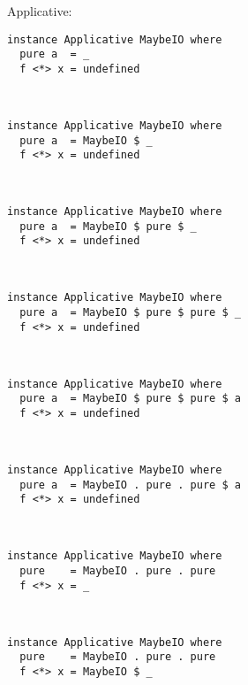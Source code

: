 \documentclass{beamer}
\begin{document}
\begin{frame}[fragile]
Applicative:
\begin{overprint}
\begin{verbatim}
instance Applicative MaybeIO where
  pure a  = _
  f <*> x = undefined
  
                 
\end{verbatim}
\begin{verbatim}
instance Applicative MaybeIO where
  pure a  = MaybeIO $ _
  f <*> x = undefined
  
                 
\end{verbatim}
\begin{verbatim}
instance Applicative MaybeIO where
  pure a  = MaybeIO $ pure $ _
  f <*> x = undefined
  
                 
\end{verbatim}
\begin{verbatim}
instance Applicative MaybeIO where
  pure a  = MaybeIO $ pure $ pure $ _
  f <*> x = undefined
  
                 
\end{verbatim}
\begin{verbatim}
instance Applicative MaybeIO where
  pure a  = MaybeIO $ pure $ pure $ a
  f <*> x = undefined
  
                 
\end{verbatim}
\begin{verbatim}
instance Applicative MaybeIO where
  pure a  = MaybeIO . pure . pure $ a
  f <*> x = undefined
  
                 
\end{verbatim}
\begin{verbatim}
instance Applicative MaybeIO where
  pure    = MaybeIO . pure . pure
  f <*> x = _
  
                 
\end{verbatim}
\begin{verbatim}
instance Applicative MaybeIO where
  pure    = MaybeIO . pure . pure
  f <*> x = MaybeIO $ _
  

\end{verbatim}
\end{overprint}
\end{frame}
\end{document}

